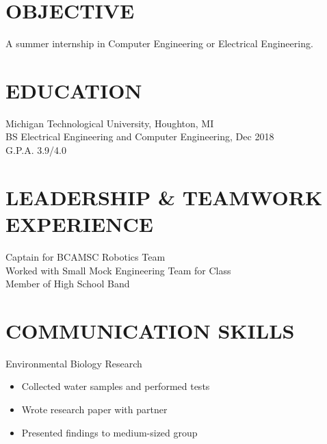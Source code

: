 \documentclass[letterpaper]{res}
\begin{document}
 


\address{\bf  PRESENT ADDRESS\\1801 Townsend Drive\\0217E East McNair\\Houghton, MI 49931}
\address{\bf PERMANENT ADDRESS \\ 14200 Stone Jug Road \\  Battle Creek, MI 49015 \\  (269) 262-6098 \\ jaevanko@mtu.edu}
                                  
\begin{resume}

\section{OBJECTIVE}          
    A summer internship in Computer Engineering or Electrical Engineering.          
 
\section{EDUCATION}          
    Michigan Technological University, Houghton, MI  \\        
    BS Electrical Engineering and Computer Engineering, Dec 2018   \\      
    G.P.A. 3.9/4.0          

\section{LEADERSHIP \& TEAMWORK EXPERIENCE}
	Captain for BCAMSC Robotics Team \\
	Worked with Small Mock Engineering Team for Class \\
	Member of High School Band

\section{COMMUNICATION SKILLS}
	Environmental Biology Research
	\begin{itemize} \itemsep1pt \parskip0pt 
		\item Collected water samples and performed tests
		\item Wrote research paper with partner
		\item Presented findings to medium-sized group
	\end{itemize}


\end{resume}
\end{document}
